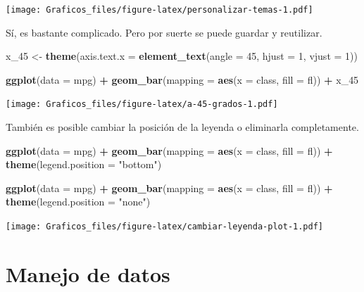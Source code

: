 \documentclass[]{book}
\newenvironment{Shaded}{\begin{snugshade}}{\end{snugshade}}
\newcommand{\DataTypeTok}[1]{\textcolor[rgb]{0.13,0.29,0.53}{#1}}
\newcommand{\DecValTok}[1]{\textcolor[rgb]{0.00,0.00,0.81}{#1}}
\newcommand{\KeywordTok}[1]{\textcolor[rgb]{0.13,0.29,0.53}{\textbf{#1}}}
\newcommand{\NormalTok}[1]{#1}
\newcommand{\OperatorTok}[1]{\textcolor[rgb]{0.81,0.36,0.00}{\textbf{#1}}}
\newcommand{\StringTok}[1]{\textcolor[rgb]{0.31,0.60,0.02}{#1}}
\theoremstyle{definition}
\theoremstyle{definition}
\theoremstyle{definition}
\theoremstyle{remark}
\begin{document}
\texttt{[image: Graficos\_files/figure-latex/personalizar-temas-1.pdf]}

Sí, es bastante complicado. Pero por suerte se puede guardar y
reutilizar.

\begin{Shaded}
\begin{Highlighting}[]
\NormalTok{x_}\DecValTok{45}\NormalTok{ <-}\StringTok{ }\KeywordTok{theme}\NormalTok{(}\DataTypeTok{axis.text.x =} \KeywordTok{element_text}\NormalTok{(}\DataTypeTok{angle =} \DecValTok{45}\NormalTok{, }\DataTypeTok{hjust =} \DecValTok{1}\NormalTok{, }\DataTypeTok{vjust =} \DecValTok{1}\NormalTok{))}

\KeywordTok{ggplot}\NormalTok{(}\DataTypeTok{data =}\NormalTok{ mpg) }\OperatorTok{+}
\StringTok{  }\KeywordTok{geom_bar}\NormalTok{(}\DataTypeTok{mapping =} \KeywordTok{aes}\NormalTok{(}\DataTypeTok{x =}\NormalTok{ class, }\DataTypeTok{fill =}\NormalTok{ fl)) }\OperatorTok{+}
\StringTok{  }\NormalTok{x_}\DecValTok{45}
\end{Highlighting}
\end{Shaded}

\texttt{[image: Graficos\_files/figure-latex/a-45-grados-1.pdf]}

También es posible cambiar la posición de la leyenda o eliminarla
completamente.

\begin{Shaded}
\begin{Highlighting}[]
\KeywordTok{ggplot}\NormalTok{(}\DataTypeTok{data =}\NormalTok{ mpg) }\OperatorTok{+}
\StringTok{  }\KeywordTok{geom_bar}\NormalTok{(}\DataTypeTok{mapping =} \KeywordTok{aes}\NormalTok{(}\DataTypeTok{x =}\NormalTok{ class, }\DataTypeTok{fill =}\NormalTok{ fl)) }\OperatorTok{+}
\StringTok{  }\KeywordTok{theme}\NormalTok{(}\DataTypeTok{legend.position =} \StringTok{"bottom"}\NormalTok{)}

\KeywordTok{ggplot}\NormalTok{(}\DataTypeTok{data =}\NormalTok{ mpg) }\OperatorTok{+}
\StringTok{  }\KeywordTok{geom_bar}\NormalTok{(}\DataTypeTok{mapping =} \KeywordTok{aes}\NormalTok{(}\DataTypeTok{x =}\NormalTok{ class, }\DataTypeTok{fill =}\NormalTok{ fl)) }\OperatorTok{+}
\StringTok{  }\KeywordTok{theme}\NormalTok{(}\DataTypeTok{legend.position =} \StringTok{"none"}\NormalTok{)}
\end{Highlighting}
\end{Shaded}

\texttt{[image: Graficos\_files/figure-latex/cambiar-leyenda-plot-1.pdf]}

\hypertarget{manejo-de-datos}{%
\chapter{Manejo de datos}\label{manejo-de-datos}}
\end{document}
